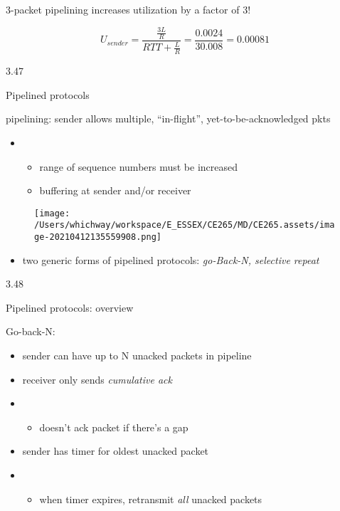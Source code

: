 \documentclass[
]{article}
\begin{document}
3-packet pipelining increases utilization by a factor of 3!

\[U_{sender} = \frac{\frac{3L}{R}}{RTT+\frac{L}{R}}=\frac{0.0024}{30.008} = 0.00081\]

3.47

Pipelined protocols

pipelining: sender allows multiple, ``in-flight'',
yet-to-be-acknowledged pkts

\begin{itemize}
\item
  \begin{itemize}
  \item
    range of sequence numbers must be increased
  \item
    buffering at sender and/or receiver
  \end{itemize}
\end{itemize}

\begin{figure}
\centering
\texttt{[image: /Users/whichway/workspace/E\_ESSEX/CE265/MD/CE265.assets/image-20210412135559908.png]}
\caption{}
\end{figure}

\begin{itemize}
\item
  two generic forms of pipelined protocols: \emph{go-Back-N, selective
  repeat}
\end{itemize}

3.48

Pipelined protocols: overview

Go-back-N:

\begin{itemize}
\item
  sender can have up to N unacked packets in pipeline
\item
  receiver only sends \emph{cumulative ack}
\item
  \begin{itemize}
  \item
    doesn't ack packet if there's a gap
  \end{itemize}
\item
  sender has timer for oldest unacked packet
\item
  \begin{itemize}
  \item
    when timer expires, retransmit \emph{all} unacked packets
  \end{itemize}
\end{itemize}
\end{document}
